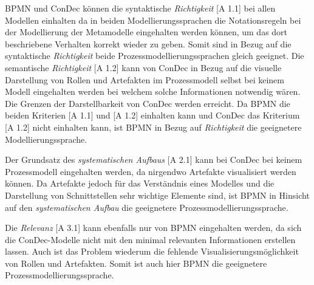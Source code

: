 {BPMN und ConDec können die syntaktische \textit{Richtigkeit} [A 1.1] bei allen Modellen einhalten da in beiden Modellierungssprachen die Notationsregeln bei der Modellierung der Metamodelle eingehalten werden können, um das dort beschriebene Verhalten korrekt wieder zu geben. Somit sind in Bezug auf die syntaktische \textit{Richtigkeit} beide Prozessmodellierungssprachen gleich geeignet.\newline
Die semantische \textit{Richtigkeit} [A 1.2] kann von ConDec in Bezug auf die visuelle Darstellung von Rollen und Artefakten im Prozessmodell selbst bei keinem Modell eingehalten werden bei welchem solche Informationen notwendig wären. Die Grenzen der Darstellbarkeit von ConDec  werden erreicht. \newline
Da BPMN die beiden Kriterien [A 1.1] und [A 1.2] einhalten kann und ConDec das Kriterium [A 1.2] nicht einhalten kann, ist BPMN in Bezug auf \textit{Richtigkeit} die geeignetere Modellierungssprache. \newline


Der  Grundsatz des \textit{systematischen Aufbaus} [A 2.1] kann bei ConDec bei keinem Prozessmodell eingehalten werden, da nirgendwo Artefakte visualisiert werden können. Da Artefakte jedoch für das Verständnis eines Modelles und die Darstellung von Schnittstellen sehr wichtige Elemente sind, ist BPMN in Hinsicht auf den \textit{systematischen Aufbau} die geeignetere Prozessmodellierungssprache. \newline


Die \textit{Relevanz} [A 3.1] kann ebenfalls nur von BPMN eingehalten werden, da sich die ConDec-Modelle nicht mit den minimal relevanten Informationen erstellen lassen. Auch ist das Problem wiederum die fehlende Visualisierungsmöglichkeit von Rollen und Artefakten. Somit ist auch hier BPMN die geeignetere Prozessmodellierungssprache.\newline

}
